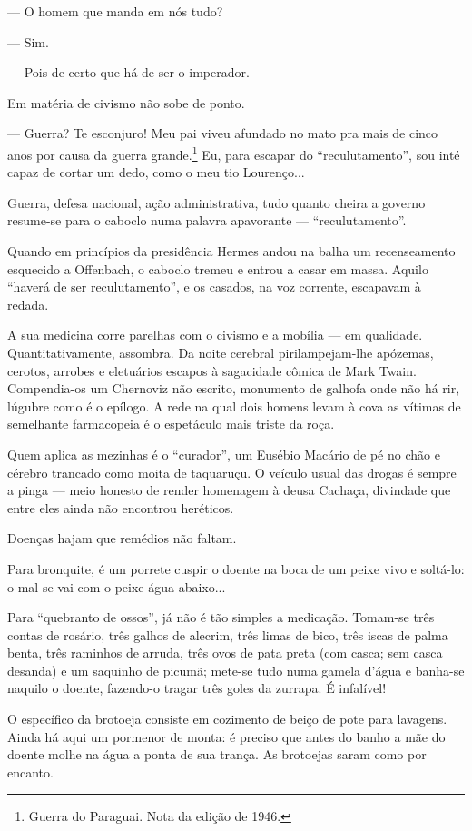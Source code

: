 --- O homem que manda em nós tudo?

--- Sim.

--- Pois de certo que há de ser o imperador.

Em matéria de civismo não sobe de ponto.

--- Guerra? Te esconjuro! Meu pai viveu afundado no mato pra mais de
cinco anos por causa da guerra grande.\footnote{Guerra do Paraguai. Nota
  da edição de 1946.} Eu, para escapar do ``reculutamento'', sou inté
capaz de cortar um dedo, como o meu tio Lourenço...

Guerra, defesa nacional, ação administrativa, tudo quanto cheira a
governo resume-se para o caboclo numa palavra apavorante ---
``reculutamento''.

Quando em princípios da presidência Hermes andou na balha um
recenseamento esquecido a Offenbach, o caboclo tremeu e entrou a casar
em massa. Aquilo ``haverá de ser reculutamento'', e os casados, na voz
corrente, escapavam à redada.

A sua medicina corre parelhas com o civismo e a mobília --- em
qualidade. Quantitativamente, assombra. Da noite cerebral
pirilampejam-lhe apózemas, cerotos, arrobes e eletuários escapos à
sagacidade cômica de Mark Twain. Compendia-os um Chernoviz não escrito,
monumento de galhofa onde não há rir, lúgubre como é o epílogo. A rede
na qual dois homens levam à cova as vítimas de semelhante farmacopeia é
o espetáculo mais triste da roça.

Quem aplica as mezinhas é o ``curador'', um Eusébio Macário de pé no
chão e cérebro trancado como moita de taquaruçu. O veículo usual das
drogas é sempre a pinga --- meio honesto de render homenagem à deusa
Cachaça, divindade que entre eles ainda não encontrou heréticos.

Doenças hajam que remédios não faltam.

Para bronquite, é um porrete cuspir o doente na boca de um peixe vivo e
soltá-lo: o mal se vai com o peixe água abaixo...

Para ``quebranto de ossos'', já não é tão simples a medicação. Tomam-se
três contas de rosário, três galhos de alecrim, três limas de bico, três
iscas de palma benta, três raminhos de arruda, três ovos de pata preta
(com casca; sem casca desanda) e um saquinho de picumã; mete-se tudo
numa gamela d'água e banha-se naquilo o doente, fazendo-o tragar três
goles da zurrapa. É infalível!

O específico da brotoeja consiste em cozimento de beiço de pote para
lavagens. Ainda há aqui um pormenor de monta: é preciso que antes do
banho a mãe do doente molhe na água a ponta de sua trança. As brotoejas
saram como por encanto.

